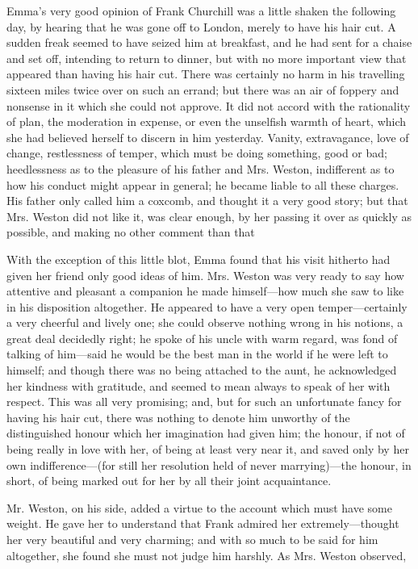 Emma's very good opinion of Frank Churchill was a little shaken the following day, by hearing that he was gone off to London, merely to have his hair cut. A sudden freak seemed to have seized him at breakfast, and he had sent for a chaise and set off, intending to return to dinner, but with no more important view that appeared than having his hair cut. There was certainly no harm in his travelling sixteen miles twice over on such an errand; but there was an air of foppery and nonsense in it which she could not approve. It did not accord with the rationality of plan, the moderation in expense, or even the unselfish warmth of heart, which she had believed herself to discern in him yesterday. Vanity, extravagance, love of change, restlessness of temper, which must be doing something, good or bad; heedlessness as to the pleasure of his father and Mrs. Weston, indifferent as to how his conduct might appear in general; he became liable to all these charges. His father only called him a coxcomb, and thought it a very good story; but that Mrs. Weston did not like it, was clear enough, by her passing it over as quickly as possible, and making no other comment than that 

With the exception of this little blot, Emma found that his visit hitherto had given her friend only good ideas of him. Mrs. Weston was very ready to say how attentive and pleasant a companion he made himself---how much she saw to like in his disposition altogether. He appeared to have a very open temper---certainly a very cheerful and lively one; she could observe nothing wrong in his notions, a great deal decidedly right; he spoke of his uncle with warm regard, was fond of talking of him---said he would be the best man in the world if he were left to himself; and though there was no being attached to the aunt, he acknowledged her kindness with gratitude, and seemed to mean always to speak of her with respect. This was all very promising; and, but for such an unfortunate fancy for having his hair cut, there was nothing to denote him unworthy of the distinguished honour which her imagination had given him; the honour, if not of being really in love with her, of being at least very near it, and saved only by her own indifference---(for still her resolution held of never marrying)---the honour, in short, of being marked out for her by all their joint acquaintance.

Mr. Weston, on his side, added a virtue to the account which must have some weight. He gave her to understand that Frank admired her extremely---thought her very beautiful and very charming; and with so much to be said for him altogether, she found she must not judge him harshly. As Mrs. Weston observed, 

